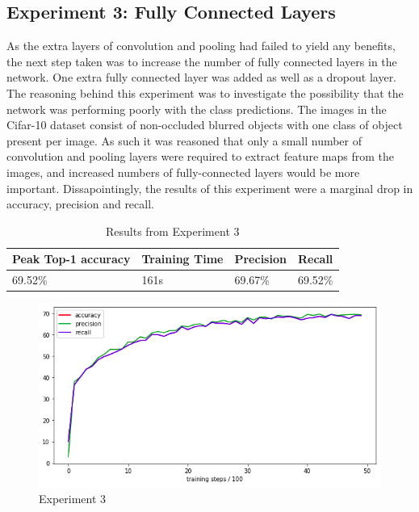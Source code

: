 \documentclass[12pt]{report}
\begin{document}
\begin{flushleft}
\vspace{0.5cm}
\section{Experiment 3: Fully Connected Layers}
As the extra layers of convolution and pooling had failed to yield any benefits, the next step taken was to increase the number of fully connected layers in the network. One extra fully connected layer was added as well as a dropout layer. The reasoning behind this experiment was to investigate the possibility that the network was performing poorly with the class predictions. The images in the Cifar-10 dataset consist of non-occluded blurred objects with one class of object present per image. As such it was reasoned that only a small number of convolution and pooling layers were required to extract feature maps from the images, and increased numbers of fully-connected layers would be more important. Dissapointingly, the results of this experiment were a marginal drop in accuracy, precision and recall.

\vspace{0.5cm}
\begin{table}[ht!]
\begin{tabular}{llll}
\\ \hline
\multicolumn{1}{|l|}{Peak Top-1 accuracy} & \multicolumn{1}{l|}{Training Time} & \multicolumn{1}{l|}{Precision} & \multicolumn{1}{l|}{Recall}  \\ \hline
\multicolumn{1}{|l|}{69.52\%}             & \multicolumn{1}{l|}{161s}          & \multicolumn{1}{l|}{69.67\%}   & \multicolumn{1}{l|}{69.52\%} \\ \hline
\end{tabular}
\caption{Results from Experiment 3}
\end{table}

\vspace{0.5cm}
\begin{figure}[ht!]
	\centering
	\includegraphics[width=12cm]{experiment-3}
	\caption{Experiment 3}
	\label{fig:experiment-3}
\end{figure}
\end{flushleft}
\end{document}
